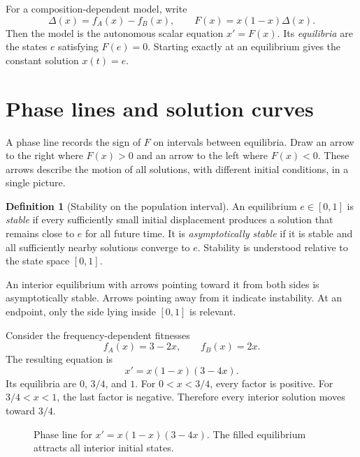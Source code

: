 \documentclass[11pt,oneside,openany]{book}
\theoremstyle{definition}
\newtheorem{definition}[theorem]{Definition}
\theoremstyle{remark}
\numberwithin{equation}{chapter}
\begin{document}
For a composition-dependent model, write
\[
\Delta(x)=f_A(x)-f_B(x),\qquad F(x)=x(1-x)\Delta(x).
\]
Then the model is the autonomous scalar equation $x'=F(x)$. Its \emph{equilibria} are the states $e$ satisfying $F(e)=0$. Starting exactly at an equilibrium gives the constant solution $x(t)=e$.

\section{Phase lines and solution curves}
A phase line records the sign of $F$ on intervals between equilibria. Draw an arrow to the right where $F(x)>0$ and an arrow to the left where $F(x)<0$. These arrows describe the motion of all solutions, with different initial conditions, in a single picture.

\begin{definition}[Stability on the population interval]
An equilibrium $e\in[0,1]$ is \emph{stable} if every sufficiently small initial displacement produces a solution that remains close to $e$ for all future time. It is \emph{asymptotically stable} if it is stable and all sufficiently nearby solutions converge to $e$. Stability is understood relative to the state space $[0,1]$.
\end{definition}

An interior equilibrium with arrows pointing toward it from both sides is asymptotically stable. Arrows pointing away from it indicate instability. At an endpoint, only the side lying inside $[0,1]$ is relevant.

Consider the frequency-dependent fitnesses
\[
f_A(x)=3-2x,\qquad f_B(x)=2x.
\]
The resulting equation is
\begin{equation}\label{eq:thread}
x'=x(1-x)(3-4x).
\end{equation}
Its equilibria are $0$, $3/4$, and $1$. For $0<x<3/4$, every factor is positive. For $3/4<x<1$, the last factor is negative. Therefore every interior solution moves toward $3/4$.

\begin{figure}[htbp]
\centering
{}
\caption{Phase line for $x'=x(1-x)(3-4x)$. The filled equilibrium attracts all interior initial states.}
\end{figure}
\end{document}
